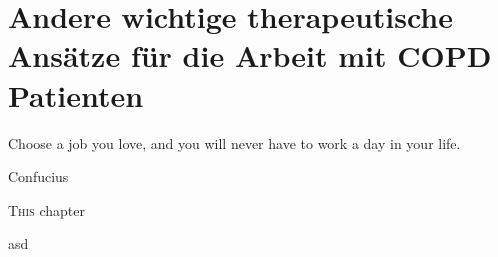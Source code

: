 \chapter{Andere wichtige therapeutische Ansätze für die Arbeit mit COPD Patienten}
\label{chapter:andere_wichtige_therapeutische_ansaetze_für_die_arbeit_mit_copd_patienten}
\epigraph{Choose a job you love, and you will never have to work a day in your life.}{Confucius}

\ifpdf
    \graphicspath{{4_segmentation/figures/PNG/}{4_andere_wichtige_therapeutische_ansaetze_fuer_die_arbeit_mit_copd_patienten/figures/PDF/}{4_andere_wichtige_therapeutische_ansaetze_fuer_die_arbeit_mit_copd_patienten/figures/}}
\else
    \graphicspath{{4_andere_wichtige_therapeutische_ansaetze_fuer_die_arbeit_mit_copd_patienten/figures/EPS/}{4_andere_wichtige_therapeutische_ansaetze_fuer_die_arbeit_mit_copd_patienten/figures/}}
\fi

\lettrine{T}{his} chapter 


asd
